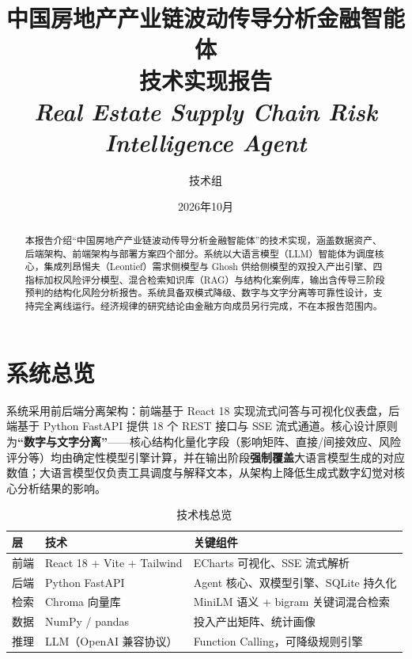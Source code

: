 \documentclass[12pt, a4paper]{ctexart}
\title{%
  \vspace{-1cm}
  {\Large 中国房地产产业链波动传导分析金融智能体}\\[0.3em]
  {\LARGE\bfseries 技术实现报告}\\[0.5em]
  {\small\textit{Real Estate Supply Chain Risk Intelligence Agent}}}
\author{技术组}
\date{2026年10月}
\begin{document}
\maketitle
\thispagestyle{empty}

\begin{abstract}
本报告介绍``中国房地产产业链波动传导分析金融智能体''的技术实现，涵盖数据资产、后端架构、前端架构与部署方案四个部分。系统以大语言模型（LLM）智能体为调度核心，集成列昂惕夫（Leontief）需求侧模型与 Ghosh 供给侧模型的双投入产出引擎、四指标加权风险评分模型、混合检索知识库（RAG）与结构化案例库，输出含传导三阶段预判的结构化风险分析报告。系统具备双模式降级、数字与文字分离等可靠性设计，支持完全离线运行。经济规律的研究结论由金融方向成员另行完成，不在本报告范围内。
\end{abstract}

\newpage
\tableofcontents
\newpage

\section{系统总览}

系统采用前后端分离架构：前端基于 React 18 实现流式问答与可视化仪表盘，后端基于 Python FastAPI 提供 18 个 REST 接口与 SSE 流式通道。核心设计原则为\textbf{``数字与文字分离''}——核心结构化量化字段（影响矩阵、直接/间接效应、风险评分等）均由确定性模型引擎计算，并在输出阶段\textbf{强制覆盖}大语言模型生成的对应数值；大语言模型仅负责工具调度与解释文本，从架构上降低生成式数字幻觉对核心分析结果的影响。

\begin{table}[htbp]
\centering
\caption{技术栈总览}
\begin{tabular}{@{}p{1.5cm}p{5.5cm}p{7.5cm}@{}}
\toprule
层 & 技术 & 关键组件 \\
\midrule
前端 & React 18 + Vite + Tailwind & ECharts 可视化、SSE 流式解析 \\
后端 & Python FastAPI & Agent 核心、双模型引擎、SQLite 持久化 \\
检索 & Chroma 向量库 & MiniLM 语义 + bigram 关键词混合检索 \\
数据 & NumPy / pandas & 投入产出矩阵、统计画像 \\
推理 & LLM（OpenAI 兼容协议） & Function Calling，可降级规则引擎 \\
\bottomrule
\end{tabular}
\end{table}

\end{document}
